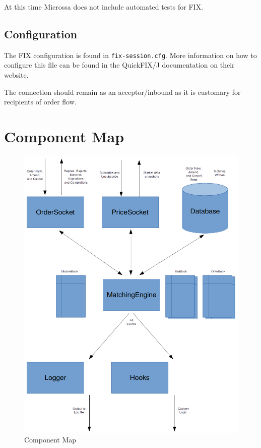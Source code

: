 \documentclass[Letter]{article}
\begin{document}
At this time Microssa does not include automated tests for FIX.

\subsection{Configuration}

The FIX configuration is found in \texttt{fix-session.cfg}. More information
on how to configure this file can be found in the QuickFIX/J documentation on
their website.

The connection should remain as an acceptor/inbound as it is customary for
recipients of order flow.

\newpage
\section{Component Map}

\begin{figure}[ht!]
\centering
\includegraphics{images/Microssa-Components.png}
\caption{Component Map \label{overflow}}
\end{figure}
\end{document}
